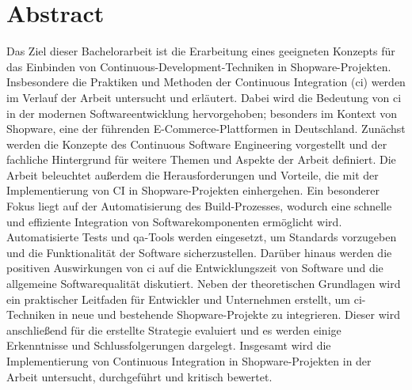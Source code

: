 
\section*{Abstract} \label{sec:00-abstract}

Das Ziel dieser Bachelorarbeit ist die Erarbeitung eines geeigneten Konzepts für das Einbinden von
Continuous-Development-Techniken in Shopware-Projekten.
Insbesondere die Praktiken und Methoden der Continuous Integration (\acrshort{ci}) werden im Verlauf der Arbeit
untersucht und erläutert.
Dabei wird die Bedeutung von \acrshort{ci} in der modernen Softwareentwicklung hervorgehoben; besonders im Kontext
von Shopware, eine der führenden E-Commerce-Plattformen in Deutschland.
Zunächst werden die Konzepte des Continuous Software Engineering vorgestellt und der fachliche Hintergrund für
weitere Themen und Aspekte der Arbeit definiert.
Die Arbeit beleuchtet außerdem die Herausforderungen und Vorteile, die mit der Implementierung von CI in
Shopware-Projekten einhergehen.
Ein besonderer Fokus liegt auf der Automatisierung des Build-Prozesses, wodurch eine schnelle und effiziente
Integration von Softwarekomponenten ermöglicht wird.
Automatisierte Tests und \acrshort{qa}-Tools werden eingesetzt, um Standards vorzugeben und die Funktionalität der
Software sicherzustellen.
Darüber hinaus werden die positiven Auswirkungen von \acrshort{ci} auf die Entwicklungszeit von Software und die
allgemeine Softwarequalität diskutiert.
Neben der theoretischen Grundlagen wird ein praktischer Leitfaden für Entwickler und Unternehmen erstellt, um
\acrshort{ci}-Techniken in neue und bestehende Shopware-Projekte zu integrieren.
Dieser wird anschließend für die erstellte Strategie evaluiert und es werden einige Erkenntnisse und Schlussfolgerungen
dargelegt.
Insgesamt wird die Implementierung von Continuous Integration in Shopware-Projekten in der Arbeit untersucht,
durchgeführt und kritisch bewertet.

\clearpage
